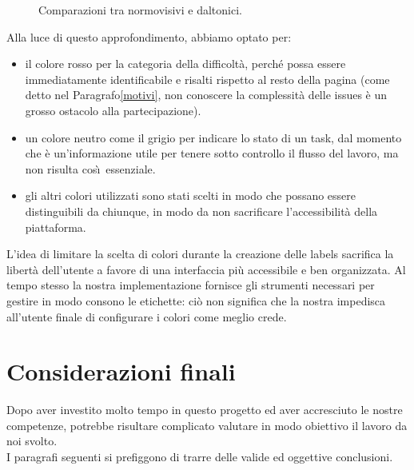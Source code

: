 \documentclass[12pt]{article} %
\begin{document}
\begin{figure}[H]
\caption{Comparazioni tra normovisivi e daltonici.}
\label{fig:daltonici}
\end{figure}

Alla luce di questo approfondimento, abbiamo optato per:
\begin{itemize}
\item il colore rosso per la categoria della difficolt\`a, perch\'e possa essere immediatamente identificabile e risalti rispetto al resto della pagina (come detto nel Paragrafo\ref{motivi}, non conoscere la complessit\`a delle issues \`e un grosso ostacolo alla partecipazione).
\item un colore neutro come il grigio per indicare lo stato di un task, dal momento che \`e un'informazione utile per tenere sotto controllo il flusso del lavoro, ma non risulta cos\`\i\ essenziale.
\item gli altri colori utilizzati sono stati scelti in modo che possano essere distinguibili da chiunque, in modo da non sacrificare l'accessibilit\`a della piattaforma.
\end{itemize}
L'idea di limitare la scelta di colori durante la creazione delle labels sacrifica la libert\`a dell'utente a favore di una interfaccia pi\`u accessibile e ben organizzata. Al tempo stesso la nostra implementazione fornisce gli strumenti necessari per gestire in modo consono le etichette: ci\`o non significa che la nostra impedisca all'utente finale di configurare i colori come meglio crede.

\newpage

\section{Considerazioni finali}
Dopo aver investito molto tempo in questo progetto ed aver accresciuto le nostre competenze, potrebbe risultare complicato valutare in modo obiettivo il lavoro da noi svolto.\\
I paragrafi seguenti si prefiggono di trarre delle valide ed oggettive conclusioni.
\end{document}
